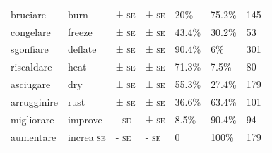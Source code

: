 \documentclass[output=paper,colorlinks,citecolor=brown
]{langscibook}
\begin{document}
\begin{table}[hbt!]
{\begin{tabular}{|p{}|p{}||p{}|p{}||p{}|p{}||p{}|}
bruciare     & burn      & ± \textsc{se}                                                                                     & ± \textsc{se}                                                                          & 20\%                              & 75.2\%                                    & 145                 \\
congelare    & freeze    & ± \textsc{se}                                                                                     & ± \textsc{se}                                                                          & 43.4\%                            & 30.2\%                                    & 53                  \\
sgonfiare    & deflate   & ± \textsc{se}                                                                                     & ± \textsc{se}                                                                          & 90.4\%                            & 6\%                                       & 301                 \\
riscaldare   & heat      & ± \textsc{se}                                                                                     & ± \textsc{se}                                                                          & 71.3\%                            & 7.5\%                                     & 80                  \\
asciugare    & dry       & ± \textsc{se}                                                                                     & ± \textsc{se}                                                                          & 55.3\%                            & 27.4\%                                    & 179                 \\
arrugginire  & rust      & ± \textsc{se}                                                                                     & ± \textsc{se}                                                                          & 36.6\%                            & 63.4\%                                    & 101                 \\
migliorare   & improve   & - \textsc{se}                                                                                     & \cellcolor[HTML]{BFBFBF}± \textsc{se}                                                  & 8.5\%                             & 90.4\%                                    & 94                  \\
aumentare    & increa \textsc{se}   & - \textsc{se}                                                                                     & - \textsc{se}                                                                          & 0                                 & 100\%                                     & 179                 \\

\end{tabular}}
\end{table}
\end{document}
